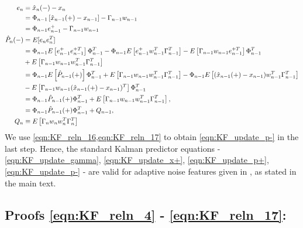 \begin{align}
e_n &= \hat{x}_{n}(-) - x_n \\
&= \Phi_{n-1}\left[\hat{x}_{n-1}(+) - x_{n-1} \right] - \Gamma_{n-1}w_{n-1} \\
&= \Phi_{n-1}e^{+}_{n-1} - \Gamma_{n-1}w_{n-1} \\
\hat{P}_{n}(-) &= E[e_ne_n^T] \\
&= \Phi_{n-1}E\left[e^{+}_{n-1}e^{+T}_{n-1}\right]\Phi_{n-1}^T  - \Phi_{n-1}E\left[e^{+}_{n-1}w_{n-1}^T\Gamma_{n-1}^T\right] - E\left[\Gamma_{n-1}w_{n-1}e^{+T}_{n-1}\right]\Phi_{n-1}^T  \\
& + E\left[\Gamma_{n-1}w_{n-1}w_{n-1}^T\Gamma_{n-1}^T\right] \\
&= \Phi_{n-1}E\left[\hat{P}_{n-1}(+)\right]\Phi_{n-1}^T  + E\left[\Gamma_{n-1}w_{n-1}w_{n-1}^T\Gamma_{n-1}^T\right] - \Phi_{n-1}E\left[(\hat{x}_{n-1}(+) - x_{n-1})w_{n-1}^T\Gamma_{n-1}^T\right] \nonumber \\
& - E\left[\Gamma_{n-1}w_{n-1}(\hat{x}_{n-1}(+) - x_{n-1})^T\right]\Phi_{n-1}^T  \nonumber  \\
&= \Phi_{n-1} \hat{P}_{n-1}(+) \Phi_{n-1}^T + E\left[\Gamma_{n-1}w_{n-1}w_{n-1}^T\Gamma_{n-1}^T\right], \label{eqn:KF_update_p-_0} \\
&= \Phi_{n-1} \hat{P}_{n-1}(+) \Phi_{n-1}^T + Q_{n-1}, \label{eqn:KF_update_p-} \\
Q_{n} & \equiv E\left[\Gamma_{n}w_{n}w_{n}^T\Gamma_{n}^T\right] 
\end{align}
We use \cref{eqn:KF_reln_16,eqn:KF_reln_17} to obtain \cref{eqn:KF_update_p-} in the last step. Hence, the standard Kalman predictor equations - \ref{eqn:KF_update_gamma}, \ref{eqn:KF_update_x+}, \ref{eqn:KF_update_p+}, \ref{eqn:KF_update_p-} - are valid for adaptive noise features given in \cite{livska2007}, as stated in the main text. 
\newpage
\subsection{Proofs \ref{eqn:KF_reln_4} - \ref{eqn:KF_reln_17}:}


